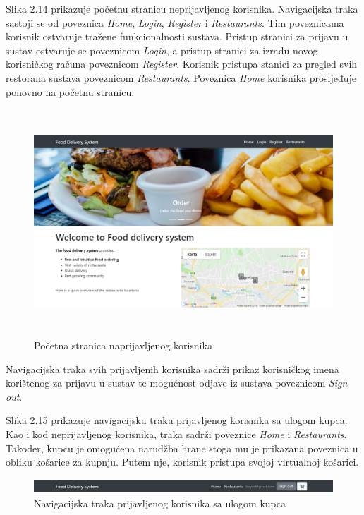 \documentclass[times, utf8, zavrsni, numeric]{fer}
\begin{document}
Slika 2.14 prikazuje početnu stranicu neprijavljenog korisnika. Navigacijska traka sastoji se od poveznica \emph{Home}, \emph{Login}, \emph{Register} i \emph{Restaurants}. Tim poveznicama korisnik ostvaruje tražene funkcionalnosti sustava. Pristup stranici za prijavu u sustav ostvaruje se poveznicom \emph{Login}, a pristup stranici za izradu novog korisničkog računa poveznicom \emph{Register}. Korisnik pristupa stanici za pregled svih restorana sustava poveznicom \emph{Restaurants}. Poveznica \emph{Home} korisnika prosljeđuje ponovno na početnu stranicu. 
\begin{figure}[htb]
\centering
\includegraphics[height=8.5cm]{pocetna-neprijavljeni.png}
\caption{Početna stranica naprijavljenog korisnika}
\label{fig:pocNep}
\end{figure}

Navigacijska traka svih prijavljenih korisnika sadrži prikaz korisničkog imena korištenog za prijavu u sustav te mogućnost odjave iz sustava poveznicom \emph{Sign out}.

Slika 2.15 prikazuje navigacijsku traku prijavljenog korisnika sa ulogom kupca. Kao i kod neprijavljenog korisnika, traka sadrži poveznice \emph{Home} i \emph{Restaurants}. Također, kupcu je omogućena narudžba hrane stoga mu je prikazana poveznica u obliku košarice za kupnju. Putem nje, korisnik pristupa svojoj virtualnoj košarici.
\begin{figure}[htb]
\centering
\includegraphics[height=0.55cm]{pocetna-kupac.png}
\caption{Navigacijska traka prijavljenog korisnika sa ulogom kupca}
\label{fig:pocKup}
\end{figure}
\end{document}
